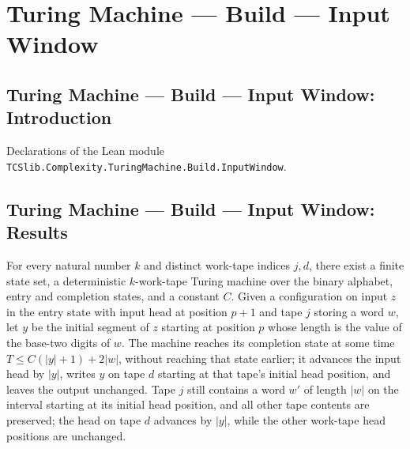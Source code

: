 \section{Turing Machine --- Build --- Input Window}
\subsection*{Turing Machine --- Build --- Input Window: Introduction}

Declarations of the Lean module \texttt{TCSlib.Complexity.TuringMachine.Build.InputWindow}.

\subsection*{Turing Machine --- Build --- Input Window: Results}

\begin{theorem}
\label{Turing.exists_inputWindowCopyTM}
\leanok
{}
For every natural number $k$ and distinct work-tape indices $j,d$, there exist a finite
state set, a deterministic $k$-work-tape Turing machine over the binary alphabet, entry
and completion states, and a constant $C$. Given a configuration on input $z$ in the
entry state with input head at position $p+1$ and tape $j$ storing a word $w$, let $y$
be the initial segment of $z$ starting at position $p$ whose length is the value of the
base-two digits of $w$. The machine reaches its completion state at some time $T \le
C(|y|+1)+2|w|$, without reaching that state earlier; it advances the input head by
$|y|$, writes $y$ on tape $d$ starting at that tape's initial head position, and leaves
the output unchanged. Tape $j$ still contains a word $w'$ of length $|w|$ on the
interval starting at its initial head position, and all other tape contents are
preserved; the head on tape $d$ advances by $|y|$, while the other work-tape head
positions are unchanged.
\end{theorem}
